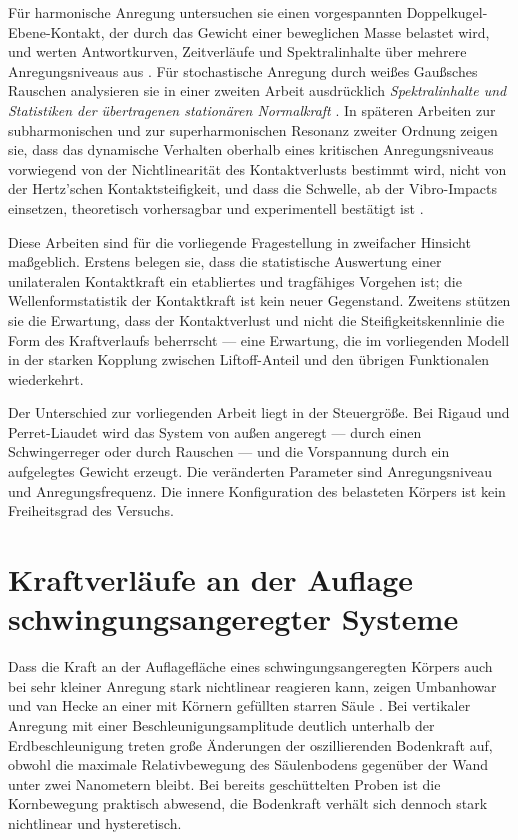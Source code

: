 \documentclass[12pt,a4paper]{report}
\begin{document}
Für harmonische Anregung untersuchen sie einen vorgespannten
Doppelkugel-Ebene-Kontakt, der durch das Gewicht einer beweglichen Masse
belastet wird, und werten Antwortkurven, Zeitverläufe und
Spektralinhalte über mehrere Anregungsniveaus aus \cite{rigaud2003}. Für
stochastische Anregung durch weißes Gaußsches Rauschen analysieren sie
in einer zweiten Arbeit ausdrücklich \emph{Spektralinhalte und
Statistiken der übertragenen stationären Normalkraft}
\cite{perretliaudet2003}. In späteren Arbeiten zur subharmonischen und zur superharmonischen
Resonanz zweiter Ordnung zeigen sie, dass das dynamische Verhalten
oberhalb eines kritischen Anregungsniveaus vorwiegend von der
Nichtlinearität des Kontaktverlusts bestimmt wird, nicht von der
Hertz'schen Kontaktsteifigkeit, und dass die Schwelle, ab der
Vibro-Impacts einsetzen, theoretisch vorhersagbar und experimentell
bestätigt ist \cite{perretliaudet2006, perretliaudet2007}.

Diese Arbeiten sind für die vorliegende Fragestellung in zweifacher
Hinsicht maßgeblich. Erstens belegen sie, dass die statistische
Auswertung einer unilateralen Kontaktkraft ein etabliertes und
tragfähiges Vorgehen ist; die Wellenformstatistik der Kontaktkraft ist
kein neuer Gegenstand. Zweitens stützen sie die Erwartung, dass der
Kontaktverlust und nicht die Steifigkeitskennlinie die Form des
Kraftverlaufs beherrscht --- eine Erwartung, die im vorliegenden Modell
in der starken Kopplung zwischen Liftoff-Anteil und den übrigen
Funktionalen wiederkehrt.

Der Unterschied zur vorliegenden Arbeit liegt in der Steuergröße. Bei
Rigaud und Perret-Liaudet wird das System von außen angeregt --- durch
einen Schwingerreger oder durch Rauschen --- und die Vorspannung durch
ein aufgelegtes Gewicht erzeugt. Die veränderten Parameter sind
Anregungsniveau und Anregungsfrequenz. Die innere Konfiguration des
belasteten Körpers ist kein Freiheitsgrad des Versuchs.

\section{Kraftverläufe an der Auflage schwingungsangeregter Systeme}

Dass die Kraft an der Auflagefläche eines schwingungsangeregten Körpers
auch bei sehr kleiner Anregung stark nichtlinear reagieren kann, zeigen
Umbanhowar und van Hecke an einer mit Körnern gefüllten starren
Säule \cite{umbanhowar2005}. Bei vertikaler Anregung mit einer
Beschleunigungsamplitude deutlich unterhalb der Erdbeschleunigung treten
große Änderungen der oszillierenden Bodenkraft auf, obwohl die maximale
Relativbewegung des Säulenbodens gegenüber der Wand unter zwei
Nanometern bleibt. Bei bereits geschüttelten Proben ist die Kornbewegung
praktisch abwesend, die Bodenkraft verhält sich dennoch stark
nichtlinear und hysteretisch.
\end{document}

